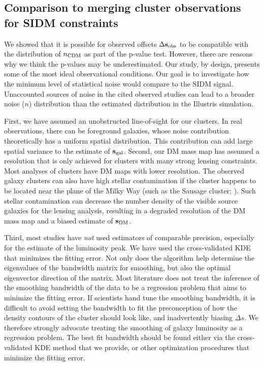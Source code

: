   
\subsection{Comparison to merging cluster observations for SIDM constraints 
}
\label{subsec:limitation_of_pvalue}
We showed that it is possible for observed offsets $\Delta {\bf s}_{\rm obs}$ to be 
compatible with the distribution of $n_{\rm CDM}$ as part of the p-value test. 
However, there are reasons why we think the p-values may be underestimated.
Our study, by design, presents some of the most ideal observational conditions. 
Our goal is to investigate how the minimum level of statistical noise would 
compare to the SIDM signal.
Unaccounted sources of noise in the cited observed studies  
can lead to a broader noise ($n$) distribution than the estimated distribution in the
Illustris simulation. 

First, we have assumed an unobstructed line-of-sight for our clusters. 
In real observations, there can be foreground galaxies, whose noise contribution
theoretically has a uniform spatial distribution. 
This contribution can add large spatial variance to the estimate of ${\bf
s}_{\rm gal}$. 
Second, our DM mass map has assumed a resolution that is only achieved for clusters 
with many strong lensing constraints. 
Most analyses of clusters have DM maps with lower resolution. 
The observed galaxy clusters can also have high stellar contamination
if the cluster happens to be located near the plane of the Milky Way 
(such as the Sausage cluster; \citealt{Jee2015}). 
Such stellar contamination can decrease the number density of the visible source galaxies for the
lensing analysis, resulting in a degraded resolution of the DM mass map and a
biased estimate of ${\bf s}_{\rm DM}$. 
  
Third, most studies have {\it not} used estimators of comparable precision, especially for
the estimate of the luminosity peak. We have used the cross-validated KDE that
minimizes the fitting error. Not only does the algorithm help
determine the eigenvalues of the bandwidth matrix for smoothing, 
but also the optimal eigenvector direction of the matrix. 
Most literature does not treat the inference of the smoothing bandwidth 
of the data to be a regression problem that aims to minimize the fitting error.  
If scientists hand tune the smoothing bandwidth, it is difficult to
avoid setting the bandwidth to fit the preconception of how the density
contours of the cluster 
should look like, and inadvertently biasing $\Delta s$. We therefore strongly
advocate treating the smoothing of galaxy luminosity as a regression problem.
The best fit bandwidth should be found either via 
the cross-validated KDE method that we provide, or other optimization  
procedures that minimize the fitting error.


